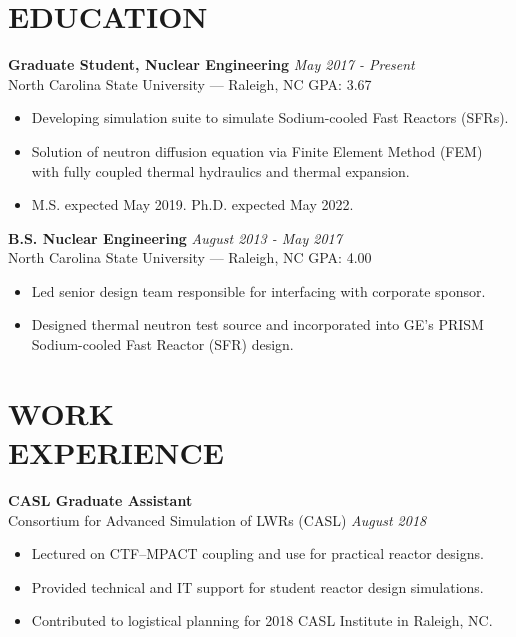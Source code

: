 \documentclass[margin, 10pt]{res}
\newcommand{\backwardspace}{-8pt}
\begin{document}
\begin{resume}


\vspace{-12pt}
 
\section{EDUCATION}  
\textbf{Graduate Student, Nuclear Engineering} \hfill 
  \textit{May 2017 - Present}\\
North Carolina State University --- Raleigh, NC \hfill GPA: 3.67
\begin{itemize}
    \item Developing simulation suite to simulate Sodium-cooled Fast Reactors 
      (SFRs).
    \item Solution of neutron diffusion equation via Finite Element Method (FEM)
      with fully coupled thermal hydraulics and thermal expansion.
    \item M.S. expected May 2019. Ph.D. expected May 2022.
\end{itemize}
\vspace{\backwardspace}
\textbf{B.S. Nuclear Engineering} \hfill \textit{August 2013 - May 2017} \\
North Carolina State University --- Raleigh, NC \hfill GPA: 4.00
\begin{itemize}
    \item Led senior design team responsible for interfacing with corporate 
      sponsor.
    \item Designed thermal neutron test source and incorporated into GE's PRISM 
      Sodium-cooled Fast Reactor (SFR) design.
\end{itemize}

 
\section{WORK \\ EXPERIENCE}

\textbf{CASL Graduate Assistant}\\
Consortium for Advanced Simulation of LWRs (CASL) \hfill \textit{August 2018}
\begin{itemize}
    \item Lectured on CTF--MPACT coupling and use for practical reactor designs.
    \item Provided technical and IT support for student reactor design 
      simulations.
    \item Contributed to logistical planning for 2018 CASL Institute in Raleigh,
      NC.
\end{itemize}


\end{resume}
\end{document}
